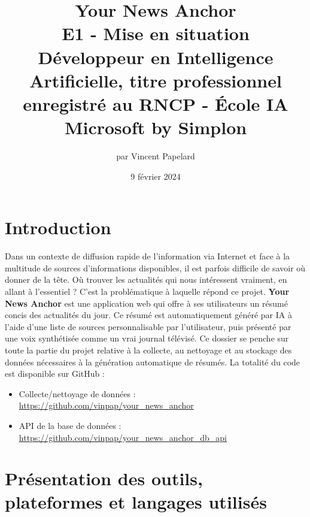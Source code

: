 \documentclass[french]{article}
\title{%
    \huge Your News Anchor  \\
    \bigskip
    \large E1 - Mise en situation \\ 
    Développeur en Intelligence Artificielle,
    titre professionnel enregistré au RNCP - École IA Microsoft by Simplon}
\date{9 février 2024}
\author{par Vincent Papelard}
\begin{document}
    \renewcommand{\contentsname}{Table des Matières}
    \maketitle
    \newpage
    \tableofcontents
    \newpage

    \section*{Introduction}
    Dans un contexte de diffusion rapide de l'information via Internet et face à la multitude de sources d'informations disponibles, il est parfois difficile de savoir où donner de la tête. Où trouver les actualités qui nous intéressent vraiment, en allant à l'essentiel ? C'est la problématique à laquelle répond ce projet.
    \textbf{Your News Anchor} est une application web qui offre à ses utilisateurs un résumé concis des actualités du jour. Ce résumé est automatiquement généré par IA à l'aide d'une liste de sources personnalisable par l'utilisateur, puis présenté par une voix synthétisée comme un vrai journal télévisé.
    Ce dossier se penche sur toute la partie du projet relative à la collecte, au nettoyage et au stockage des données nécessaires à la génération automatique de résumés.
    La totalité du code est disponible sur GitHub :
    \begin{itemize}
        \item Collecte/nettoyage de données : \url{https://github.com/vinpap/your_news_anchor}
        \item API de la base de données : \url{https://github.com/vinpap/your_news_anchor_db_api}
    \end{itemize}

    \section{Présentation des outils, plateformes et langages utilisés}
\end{document}
